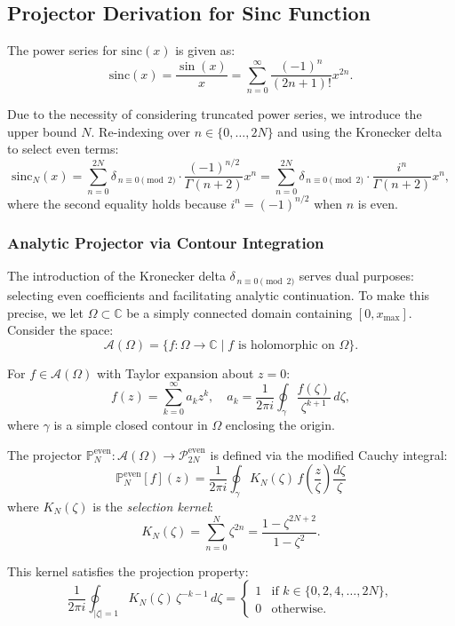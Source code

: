 \subsection{Projector Derivation for Sinc Function}
\label{sec:projector_derivation}

The power series for $\mathrm{sinc}(x)$ is given as:
\[
\mathrm{sinc}(x) = \frac{\sin(x)}{x} = \sum_{n=0}^\infty \frac{(-1)^n}{(2n+1)!}x^{2n}.
\]

Due to the necessity of considering truncated power series, we introduce the upper bound $N$. Re-indexing over $n \in \{0,\dots,2N\}$ and using the Kronecker delta to select even terms:
\begin{equation}\label{eq:sinc_proj}
\mathrm{sinc}_N(x) = \sum_{n=0}^{2N} \delta_{\,n \equiv 0 \pmod{2}} \cdot \frac{(-1)^{n/2}}{\Gamma(n+2)}x^{n}
= \sum_{n=0}^{2N} \delta_{\,n \equiv 0 \pmod{2}} \cdot \frac{i^n}{\Gamma(n+2)}x^{n},
\end{equation}
where the second equality holds because $i^n = (-1)^{n/2}$ when $n$ is even.

\subsubsection{Analytic Projector via Contour Integration}

The introduction of the Kronecker delta $\delta_{\,n \equiv 0 \pmod{2}}$ serves dual purposes: selecting even coefficients and facilitating analytic continuation. To make this precise, we let $\Omega \subset \mathbb{C}$ be a simply connected domain containing $[0, x_{\max}]$. Consider the space:
\[
\mathcal{A}(\Omega) = \{ f: \Omega \to \mathbb{C} \mid f \text{ is holomorphic on } \Omega \}.
\]

For $f \in \mathcal{A}(\Omega)$ with Taylor expansion about $z=0$:
\[
f(z) = \sum_{k=0}^{\infty} a_k z^k, \quad a_k = \frac{1}{2\pi i} \oint_{\gamma} \frac{f(\zeta)}{\zeta^{k+1}} \, d\zeta,
\]
where $\gamma$ is a simple closed contour in $\Omega$ enclosing the origin.

The projector $\mathbb{P}_N^{\text{even}}: \mathcal{A}(\Omega) \to \mathcal{P}_{2N}^{\text{even}}$ is defined via the modified Cauchy integral:
\[
\mathbb{P}_N^{\text{even}}[f](z) = \frac{1}{2\pi i} \oint_{\gamma} K_N(\zeta) \, f\!\left(\frac{z}{\zeta}\right) \frac{d\zeta}{\zeta}
\]
where $K_N(\zeta)$ is the \emph{selection kernel}:
\[
K_N(\zeta) = \sum_{n=0}^{N} \zeta^{2n} = \frac{1 - \zeta^{2N+2}}{1 - \zeta^2}.
\]

This kernel satisfies the projection property:
\[
\frac{1}{2\pi i} \oint_{|\zeta|=1} K_N(\zeta) \, \zeta^{-k-1} \, d\zeta = \begin{cases}
1 & \text{if } k \in \{0, 2, 4, \ldots, 2N\}, \\
0 & \text{otherwise.}
\end{cases}
\]

